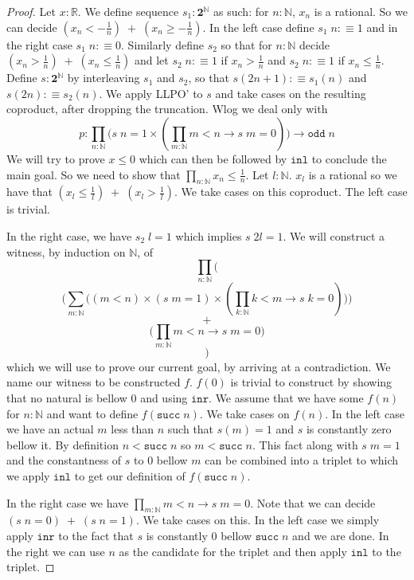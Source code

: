 \documentclass[12pt]{report}
\begin{document}
\begin{proof}
Let $x : \mathbb{R}$. 
We define sequence $s_{1} : \mathbf{2}^\mathbb{N}$ as such: for $n : \mathbb{N}$, $x_n$ is a rational. 
So we can decide $(x_n < -\frac{1}{n})\;+\;(x_n \geq -\frac{1}{n})$. 
In the left case define $s_1\; n :\equiv 1$ and in the right case $s_1\; n :\equiv 0$. 
Similarly define $s_2$ so that for $n : \mathbb{N}$ decide $(x_n > \frac{1}{n})\;+\;(x_n \leq \frac{1}{n})$ and let $s_2\;n:\equiv 1$ if $x_n > \frac{1}{n}$ and $s_2\;n :\equiv 1$ if 
$x_n \leq \frac{1}{n}$. 
Define $s : \mathbf{2}^\mathbb{N}$ by interleaving $s_1$ and $s_2$, so that $s(2n+1) :\equiv s_1(n)$ and $s(2n) :\equiv s_2(n)$. 
We apply LLPO' to $s$ and take cases on the resulting coproduct, after dropping the truncation. 
Wlog we deal only with 
$$p : \prod_{n : \mathbb{N}} \big( s\;n = 1 \times (\prod_{m : \mathbb{N}} m < n \rightarrow s\;m=0) \big) \rightarrow \mathtt{odd}\;n$$
We will try to prove $x \leq 0$ which can then be followed by $\mathtt{inl}$ to conclude the main goal. 
So we need to show that $\prod_{n : \mathbb{N}}x_n \leq \frac{1}{n}$. 
Let $l : \mathbb{N}$. $x_l$ is a rational so we have that $(x_l \leq \frac{1}{l})\;+\;(x_l > \frac{1}{l})$. 
We take cases on this coproduct. The left case is trivial. 

In the right case, we have $s_2\;l = 1$ which implies $s\;2l = 1$. 
We will construct a witness, by induction on $\mathbb{N}$, of 
$$\prod_{n : \mathbb{N}} \bigg($$
$$\Big(\sum_{m : \mathbb{N}}\big( (m < n) \times (s\;m = 1) \times (\prod_{k : \mathbb{N}} k < m \rightarrow s\;k = 0)\big)\Big)$$
$$+$$
$$ \big( \prod_{ m : \mathbb{N}} m < n \rightarrow s\;m = 0 \big) $$
$$\bigg)$$
which we will use to prove our current goal, by arriving at a contradiction. 
We name our witness to be constructed $f$. 
$f(0)$ is trivial to construct by showing that no natural is bellow $0$ and using $\mathtt{inr}$. 
We assume that we have some $f(n)$ for $n : \mathbb{N}$ and want to define $f(\mathtt{succ}\; n)$. 
We take cases on $f(n)$. 
In the left case we have an actual $m$ less than $n$ such that $s(m) = 1$ and $s$ is constantly zero bellow it. 
By definition $n < \mathtt{succ}\;n$ so $m < \mathtt{succ}\;n$. 
This fact along with $s\;m = 1$ and the constantness of $s$ to $0$ bellow $m$ can be combined into a triplet to which we apply $\mathtt{inl}$ to get our definition of $f(\mathtt{succ}\; n)$. 

In the right case we have $\prod_{ m : \mathbb{N}} m < n \rightarrow s\;m = 0$. 
Note that we can decide $(s\;n = 0)\;+\;(s\;n = 1)$. 
We take cases on this. 
In the left case we simply apply $\mathtt{inr}$ to the fact that $s$ is constantly $0$ bellow $\mathtt{succ}\;n$ and we are done. 
In the right we can use $n$ as the candidate for the triplet and then apply $\mathtt{inl}$ to the triplet. 


\end{proof}
\end{document}
